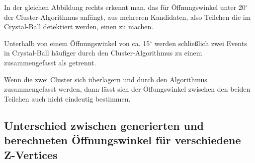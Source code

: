 \documentclass[a4paper,11pt,oneside,final,german,openbib,pdftex]{scrbook}
\begin{document}
{In der gleichen Abbildung rechts erkennt man, das f\"ur \"Offnungswinkel unter 20$^{\circ}$ der Cluster-Algorithmus anf\"angt, aus mehreren Kandidaten, also Teilchen die im Crystal-Ball detektiert werden, einen zu machen.

Unterhalb von einem \"Offnungswinkel von ca. 15$^{\circ}$ werden schlie{\ss}lich zwei Events in Crystal-Ball h\"aufiger durch den Cluster-Algorithmus zu einem zusammengefasst als getrennt. 

Wenn die zwei Cluster sich \"uberlagern und durch den Algorithmus zusammengefasst werden, dann l\"asst sich der \"Offungswinkel zwischen den beiden Teilchen auch nicht eindeutig bestimmen.


\subsection{Unterschied zwischen generierten und berechneten \"Offnungswinkel f\"ur verschiedene Z-Vertices}





}
\end{document}
